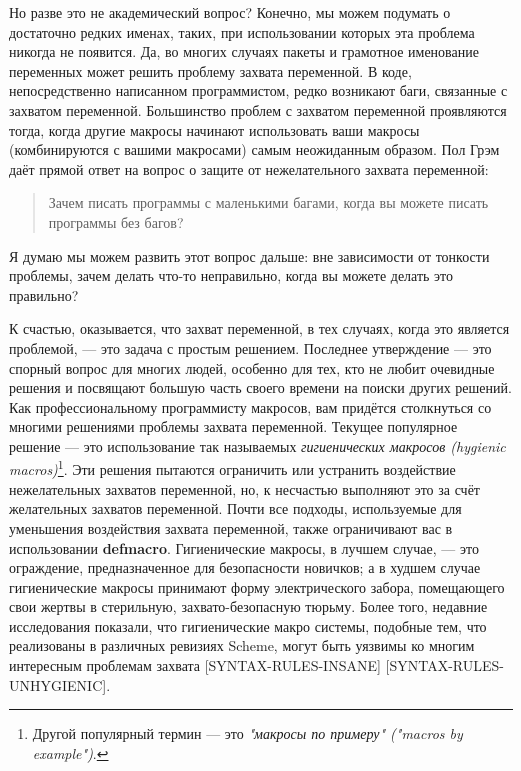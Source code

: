 Но разве это не академический вопрос? Конечно, мы можем подумать о достаточно редких именах, таких, при использовании которых эта проблема никогда не появится. Да, во многих случаях пакеты и грамотное именование переменных может решить проблему захвата переменной. В коде, непосредственно написанном программистом, редко возникают баги, связанные с захватом переменной. Большинство проблем с захватом переменной проявляются тогда, когда другие макросы начинают использовать ваши макросы (комбинируются с вашими макросами) самым неожиданным образом. Пол Грэм даёт прямой ответ на вопрос о защите от нежелательного захвата переменной:

\begin{quote}
Зачем писать программы с маленькими багами, когда вы можете писать программы без багов?
\end{quote}

Я думаю мы можем развить этот вопрос дальше: вне зависимости от тонкости проблемы, зачем делать что-то неправильно, когда вы можете делать это правильно?

К счастью, оказывается, что захват переменной, в тех случаях, когда это является проблемой, --- это задача с простым решением. Последнее утверждение --- это спорный вопрос для многих людей, особенно для тех, кто не любит очевидные решения и посвящают большую часть своего времени на поиски других решений. Как профессиональному программисту макросов, вам придётся столкнуться со многими решениями проблемы захвата переменной. Текущее популярное решение --- это использование так называемых \emph{гигиенических макросов (hygienic macros)}\footnote{Другой популярный термин --- это \emph{"макросы по примеру" ("macros by example")}.}. Эти решения пытаются ограничить или устранить воздействие нежелательных захватов переменной, но, к несчастью выполняют это за счёт желательных захватов переменной. Почти все подходы, используемые для уменьшения воздействия захвата переменной, также ограничивают вас в использовании \textbf{defmacro}. Гигиенические макросы, в лучшем случае, --- это ограждение, предназначенное для безопасности новичков; а в худшем случае гигиенические макросы принимают форму электрического забора, помещающего свои жертвы в стерильную, захвато-безопасную тюрьму. Более того, недавние исследования показали, что гигиенические макро системы, подобные тем, что реализованы в различных ревизиях Scheme, могут быть уязвимы ко многим интересным проблемам захвата [SYNTAX-RULES-INSANE] [SYNTAX-RULES-UNHYGIENIC].

